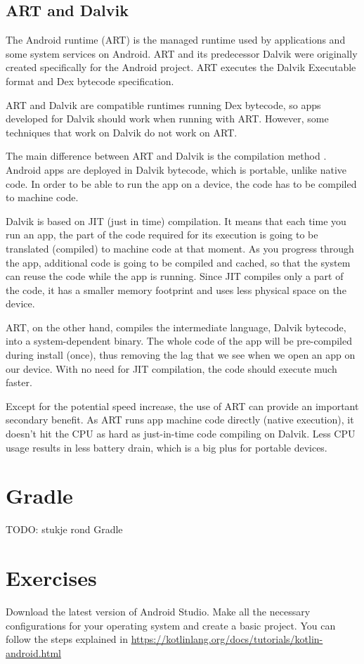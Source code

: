 \subsection{ART and Dalvik}
The Android runtime (ART) \cite{Android2019} is the managed runtime used by applications and some system services on Android.
ART and its predecessor Dalvik were originally created specifically for the Android project.
ART executes the Dalvik Executable format and Dex bytecode specification.

ART and Dalvik are compatible runtimes running Dex bytecode, so apps developed for Dalvik should work when running with ART.
However, some techniques that work on Dalvik do not work on ART.

The main difference between ART and Dalvik is the compilation method \cite{Vitas2013}.
Android apps are deployed in Dalvik bytecode, which is portable, unlike native code.
In order to be able to run the app on a device, the code has to be compiled to machine code.

Dalvik is based on JIT (just in time) compilation.
It means that each time you run an app, the part of the code required for its execution is going to be translated (compiled) to machine code at that moment.
As you progress through the app, additional code is going to be compiled and cached, so that the system can reuse the code while the app is running.
Since JIT compiles only a part of the code, it has a smaller memory footprint and uses less physical space on the device.

ART, on the other hand, compiles the intermediate language, Dalvik bytecode, into a system-dependent binary.
The whole code of the app will be pre-compiled during install (once), thus removing the lag that we see when we open an app on our device.
With no need for JIT compilation, the code should execute much faster.

Except for the potential speed increase, the use of ART can provide an important secondary benefit.
As ART runs app machine code directly (native execution), it doesn't hit the CPU as hard as just-in-time code compiling on Dalvik.
Less CPU usage results in less battery drain, which is a big plus for portable devices.

\section{Gradle}
TODO: stukje rond Gradle


\section{Exercises}
\begin{exercise}
	Download the latest version of Android Studio.
	Make all the necessary configurations for your operating system and create a basic project.
	You can follow the steps explained in \url{https://kotlinlang.org/docs/tutorials/kotlin-android.html}
\end{exercise}

